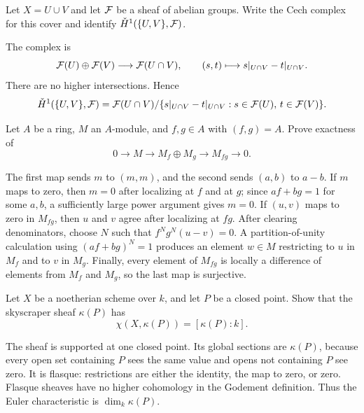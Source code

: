 \begin{exercise}\label{ex:cech-two-open}
Let \(X=U\cup V\) and let \(\mathcal{F}\) be a sheaf of abelian groups.  Write the Cech
complex for this cover and identify \(\check{H}^1(\{U,V\},\mathcal{F})\).
\end{exercise}

\begin{solution}
The complex is
\[
    \mathcal{F}(U)\oplus\mathcal{F}(V)\longrightarrow \mathcal{F}(U\cap V),
    \qquad (s,t)\longmapsto s|_{U\cap V}-t|_{U\cap V}.
\]
There are no higher intersections.  Hence
\[
    \check{H}^1(\{U,V\},\mathcal{F})=
    \mathcal{F}(U\cap V)/
    \{s|_{U\cap V}-t|_{U\cap V}:s\in\mathcal{F}(U),\,t\in\mathcal{F}(V)\}.
\]
\end{solution}

\begin{exercise}\label{ex:principal-acyclic}
Let \(A\) be a ring, \(M\) an \(A\)-module, and \(f,g\in A\) with
\((f,g)=A\).  Prove exactness of
\[
    0\to M\to M_f\oplus M_g\to M_{fg}\to0.
\]
\end{exercise}

\begin{solution}
The first map sends \(m\) to \((m,m)\), and the second sends \((a,b)\) to
\(a-b\).  If \(m\) maps to zero, then \(m=0\) after localizing at \(f\) and at
\(g\); since \(af+bg=1\) for some \(a,b\), a sufficiently large power argument
gives \(m=0\).  If \((u,v)\) maps to zero in \(M_{fg}\), then \(u\) and \(v\)
agree after localizing at \(fg\).  After clearing denominators, choose \(N\)
such that \(f^Ng^N(u-v)=0\).  A partition-of-unity calculation using
\((af+bg)^N=1\) produces an element \(w\in M\) restricting to \(u\) in \(M_f\)
and to \(v\) in \(M_g\).  Finally, every element of \(M_{fg}\) is locally a
difference of elements from \(M_f\) and \(M_g\), so the last map is surjective.
\end{solution}

\begin{exercise}\label{ex:skyscraper-euler}
Let \(X\) be a noetherian scheme over \(k\), and let \(P\) be a closed point.
Show that the skyscraper sheaf \(\kappa(P)\) has
\[
    \chi(X,\kappa(P))=[\kappa(P):k].
\]
\end{exercise}

\begin{solution}
The sheaf is supported at one closed point.  Its global sections are
\(\kappa(P)\), because every open set containing \(P\) sees the same value and
opens not containing \(P\) see zero.  It is flasque: restrictions are either
the identity, the map to zero, or zero.  Flasque sheaves have no higher
cohomology in the Godement definition.  Thus the Euler characteristic is
\(\dim_k\kappa(P)\).
\end{solution}

